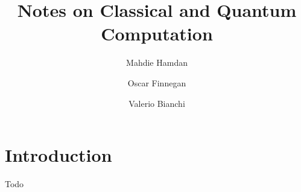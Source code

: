 \documentclass[11pt, tikz]{book}
\begin{document}
\newcommand{\bicatlca}{\operatorname{BicatLCA}}
\newcommand{\born}[1]{\mathcal{#1}}
\newcommand{\topalg}{\operatorname{TopAlg}}
\newcommand{\fm}[1]{\cat{M}_{#1}^{\operatorname{( F)}} }
\newcommand{\res}{\operatorname{Restr}}
\title{Notes on Classical and Quantum Computation}
\author{Mahdie Hamdan}
\author{Oscar Finnegan}
\author{Valerio Bianchi}
\maketitle
\newpage 
\tableofcontents 
\newpage

\chapter{Introduction}

\begin{definition}
\red Todo\black 
\end{definition}
\end{document}
